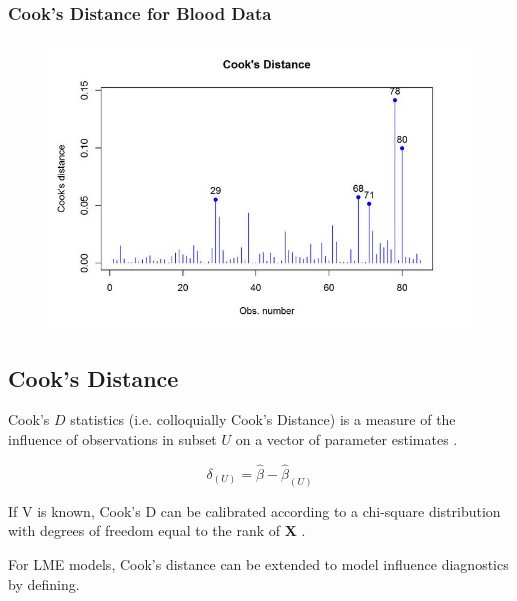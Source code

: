 \documentclass[12pt, a4paper]{report}
\theoremstyle{plain}
\theoremstyle{definition}
\theoremstyle{remark}
\begin{document}
\subsubsection{Cook's Distance for Blood Data}
\begin{figure}[h!]
	\centering
	\includegraphics[width=0.9\linewidth]{images/CooksDistancePlot-JS-Roy}
\end{figure}


\subsection{Cook's Distance}%
 Cook's $D$ statistics (i.e. colloquially Cook's Distance) is a measure of the influence of observations in subset $U$ on a vector of parameter estimates \citep{cook77}.

\[ \delta_{(U)} = \hat{\beta} - \hat{\beta}_{(U)}\]

If V is known, Cook's D can be calibrated according to a chi-square distribution with degrees of freedom equal to the rank of $\boldsymbol{X}$ \citep{cpj92}.


For LME models, Cook's distance can be extended to model influence diagnostics by defining.

\end{document}
